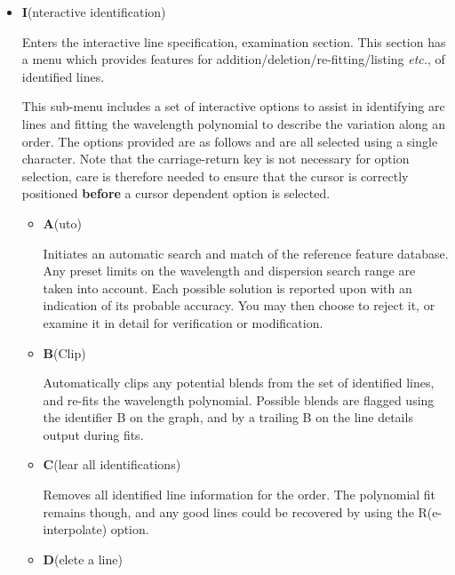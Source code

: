 \documentclass[11pt,twoside]{article}
\newcommand{\sunspec}[2]{#1}
\renewcommand{\sunspec}[2]{#2}
\newcommand{\myindex}[1]{\index{#1}}
\renewcommand{\myindex}[1]{}
\begin{document}
\begin{itemize}
\item {\sunspec{\Large\tt}{\bf} I}(nteractive identification)

      Enters the interactive
      line specification, examination section. This section has a menu
      which provides features for addition/deletion/re-fitting/listing {\it
      etc.}, of identified lines.

      This sub-menu includes a set of interactive options to assist in
      identifying arc lines and fitting the wavelength polynomial to
      describe the variation along an order. The options provided are as
      follows and are all selected using a single character. Note that the
      carriage-return key is not necessary for option selection, care is
      therefore needed to ensure that the cursor is correctly positioned
      {\bf before} a cursor dependent option is selected.

      \begin{itemize}

      \item {\sunspec{\Large\tt}{\bf} A}(uto)

            Initiates an automatic search and match of
            the reference feature database. Any preset limits on the
            wavelength and dispersion search range are taken into account.
            Each possible solution is reported upon with an indication of
            its probable accuracy.  You may then choose to reject it,
            or examine it in detail for verification or modification.

      \item {\sunspec{\Large\tt}{\bf} B}(Clip)
            \myindex{Arc fitting!blends}
            Automatically clips any potential blends
            from the set of identified lines, and re-fits the wavelength
            polynomial. Possible blends are flagged using the identifier B
            on the graph, and by a trailing B on the line details output
            during fits.

      \item {\sunspec{\Large\tt}{\bf} C}(lear all identifications)
            \myindex{Arc fitting!clear}

            Removes all
            identified line information for the order. The polynomial fit
            remains though, and any good lines could be recovered by using
            the R(e-interpolate) option.

      \item {\sunspec{\Large\tt}{\bf} D}(elete a line)
            \myindex{Arc fitting!delete line}


\end{itemize}
\end{itemize}
\end{document}
